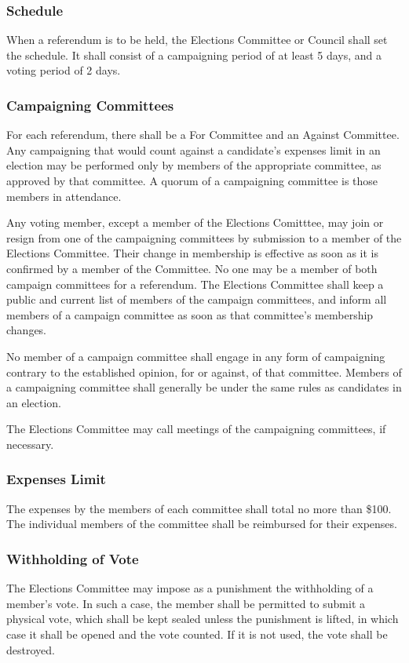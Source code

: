 \subsubsection{Schedule}
When a referendum is to be held, the Elections Committee or Council shall set
the schedule. It shall consist of a campaigning period of at least 5 days, and a
voting period of 2 days.

\subsubsection{Campaigning Committees}
For each referendum, there shall be a For Committee and an Against Committee.
Any campaigning that would count against a candidate's expenses limit in an
election may be performed only by members of the appropriate committee, as
approved by that committee. A quorum of a campaigning committee is those members
in attendance.

Any voting member, except a member of the Elections Comitttee, may join or
resign from one of the campaigning committees by submission to a member of the
Elections Committee. Their change in membership is effective as soon as it is
confirmed by a member of the Committee. No one may be a member of both campaign
committees for a referendum. The Elections Committee shall keep a public and
current list of members of the campaign committees, and inform all members of a
campaign committee as soon as that committee's membership changes.

No member of a campaign committee shall engage in any form of campaigning
contrary to the established opinion, for or against, of that committee. Members
of a campaigning committee shall generally be under the same rules as candidates
in an election.

The Elections Committee may call meetings of the campaigning committees, if
necessary.

\subsubsection{Expenses Limit}
The expenses by the members of each committee shall total no more than \$100.
The individual members of the committee shall be reimbursed for their expenses.

\subsubsection{Withholding of Vote}
The Elections Committee may impose as a punishment the withholding of a member's
vote. In such a case, the member shall be permitted to submit a physical vote,
which shall be kept sealed unless the punishment is lifted, in which case it
shall be opened and the vote counted. If it is not used, the vote shall be
destroyed.
